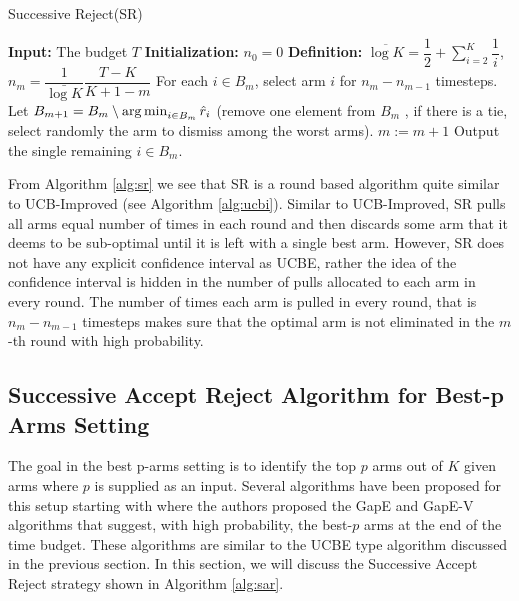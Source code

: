 \begin{algorithm}[!th]
\caption{Successive Reject(SR)}
\label{alg:sr}
\begin{algorithmic}[1]
\State \textbf{Input: } The budget $T$
\State \textbf{Initialization: } $n_0 = 0$
\State \textbf{Definition: } $\overline{\log K} = \dfrac{1}{2} + \sum_{i=2}^{K}\dfrac{1}{i}$, $n_m = \dfrac{1}{\bar{\log K}}\dfrac{T-K}{K + 1 - m}$
\State For each $i \in B_{m}$, select arm $i$ for $n_m - n_{m-1}$ timesteps.
\State Let $B_{m+1} = B_m\setminus \operatorname*{arg\,min}_{i\in B_m} \hat{r}_i$
(remove one element from $B_m$ , if there
is a tie, select randomly the arm to dismiss among the worst arms).
\State $m:=m+1 $
\EndFor
\State Output the single remaining $i\in B_{m}$.
\end{algorithmic}
\end{algorithm}


From Algorithm \ref{alg:sr} we see that SR is a round based algorithm quite similar to UCB-Improved (see Algorithm \ref{alg:ucbi}). Similar to UCB-Improved, SR pulls all arms equal number of times in each round and then discards some arm that it deems to be sub-optimal until it is left with a single best arm. However, SR does not have any explicit confidence interval as UCBE, rather the idea of the confidence interval is hidden in the number of pulls allocated to each arm in every round. The number of times each arm is pulled in every round, that is $n_m - n_{m-1}$ timesteps makes sure that the optimal arm is not eliminated in the $m$-th round with high probability. 


\subsection{Successive Accept Reject Algorithm for Best-p Arms Setting}

The goal in the best p-arms setting is to identify the top $p$ arms out of $K$ given arms where $p$ is supplied as an input. Several algorithms have been proposed for this setup starting with \citet{gabillon2011multi} where the authors proposed the GapE and GapE-V algorithms that suggest, with high probability, the best-$p$ arms at the end of the time budget. These algorithms are similar to the UCBE type algorithm discussed in the previous section. In this section, we will discuss the Successive Accept Reject strategy shown in Algorithm \ref{alg:sar}.


